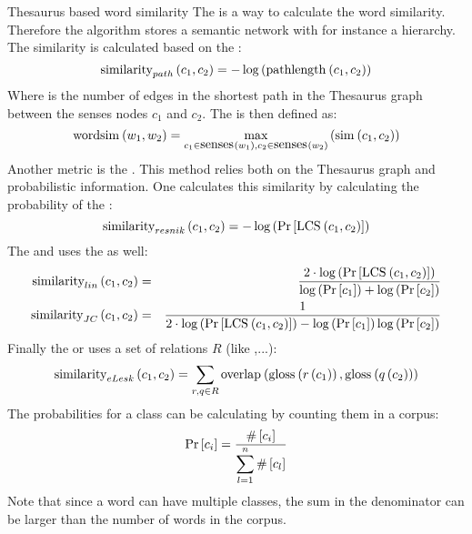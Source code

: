 \begin{df}{Thesaurus based word similarity}
The \sb{} is a way to calculate the word similarity. Therefore the algorithm stores a semantic network with for instance a  hierarchy. The similarity is calculated based on the :
\begin{equation}
\funm[path]{similarity}{c_1,c_2}=-\fun{\log}{\funm{pathlength}{c_1,c_2}}
\end{equation}
Where  is the number of edges in the shortest path in the Thesaurus graph between the senses nodes $c_1$ and $c_2$. The  is then defined as:
\begin{equation}
\funm{wordsim}{w_1,w_2}=\fun{\max_{c_1\in\funm{senses}{w_1},c_2\in\funm{senses}{w_2}}}{\funm{sim}{c_1,c_2}}
\end{equation}
Another metric is the . This method relies both on the Thesaurus graph and probabilistic information. One calculates this similarity by calculating the probability of the :
\begin{equation}
\funm[resnik]{similarity}{c_1,c_2}=-\fun{\log}{\Prob{\funm{LCS}{c_1,c_2}}}
\end{equation}
The  and  uses the  as well:
\begin{eqnarray}
\funm[lin]{similarity}{c_1,c_2}&=&\displaystyle\frac{2\cdot\fun{\log}{\Prob{\funm{LCS}{c_1,c_2}}}}{\fun{\log}{\Prob{c_1}}+\fun{\log}{\Prob{c_2}}}\\
\funm[JC]{similarity}{c_1,c_2}&=&\displaystyle\frac{1}{2\cdot\fun{\log}{\Prob{\funm{LCS}{c_1,c_2}}}-\fun{\log}{\Prob{c_1}}\fun{\log}{\Prob{c_2}}}\\
\end{eqnarray}
Finally the  or  uses a set of relations $R$ (like ,...):
\begin{equation}
\funm[eLesk]{similarity}{c_1,c_2}=\displaystyle\sum_{r,q\in R}\funm{overlap}{\funm{gloss}{\fun{r}{c_1}},\funm{gloss}{\fun{q}{c_2}}}
\end{equation}
The probabilities for a class can be calculating by counting them in a corpus:
\begin{equation}
\Prob{c_i}=\displaystyle\frac{\Count{c_i}}{\displaystyle\sum_{l=1}^{n}\Count{c_l}}
\end{equation}
Note that since a word can have multiple classes, the sum in the denominator can be larger than the number of words in the corpus.
\end{df}

